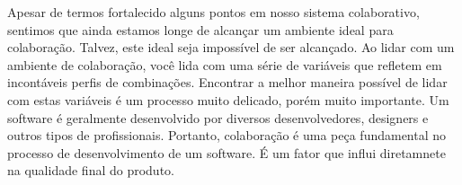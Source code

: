 \documentclass{acm_proc_article-sp}
\begin{document}
Apesar de termos fortalecido alguns pontos em nosso sistema colaborativo, sentimos que ainda estamos longe de alcançar
um ambiente ideal para colaboração. Talvez, este ideal seja impossível de ser alcançado. Ao lidar com um ambiente de colaboração,
você lida com uma série de variáveis que refletem em incontáveis perfis de combinações. Encontrar a melhor maneira possível de 
lidar com estas variáveis é um processo muito delicado, porém muito importante. Um software é geralmente desenvolvido por diversos desenvolvedores, designers e outros tipos de profissionais. Portanto, colaboração é uma peça fundamental no processo de desenvolvimento
de um software. É um fator que influi diretamnete na qualidade final do produto.




%


\balancecolumns
\end{document}
